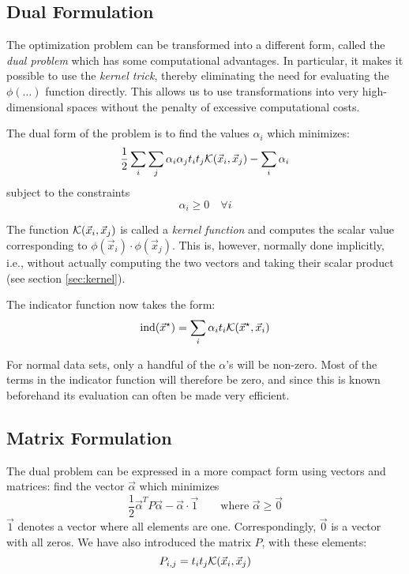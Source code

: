 \documentclass{article}
\begin{document}
\subsection{Dual Formulation}

The optimization problem can be transformed into a different form,
called the \emph{dual problem} which has some computational
advantages.  In particular, it makes it possible to use the
\emph{kernel trick}, thereby eliminating the need for evaluating the
\(\phi(\ldots)\) function directly.  This allows us to use
transformations into very high-dimensional spaces without the
penalty of excessive computational costs.

The dual form of the problem is to find the values \(\alpha_i\) which minimizes:
\begin{equation}\label{eq:dual}
  \frac{1}{2}\sum_i\sum_j\alpha_i\alpha_j t_it_j
  {\cal K}(\vec{x}_i, \vec{x}_j)
  -\sum_i\alpha_i
\end{equation}
subject to the constraints
\begin{equation}\label{eq:dualconstraints}
  \alpha_i \ge 0 \quad \forall i
\end{equation}

The function \({\cal K}(\vec{x}_i, \vec{x}_j)\) is called a \emph{kernel
  function} and computes the scalar value corresponding to
\(\phi(\vec{x}_i)\cdot\phi(\vec{x}_j)\).  This is, however, normally done
implicitly, i.e., without actually computing the two vectors and
taking their scalar product (see section \ref{sec:kernel}).

The indicator function now takes the form:
\begin{equation}\label{eq:dualindicator}
  \mathrm{ind}(\vec{x}^\star) = \sum_i \alpha_i t_i
  {\cal K}(\vec{x}^\star, \vec{x}_i)
\end{equation}

For normal data sets, only a handful of the \(\alpha\)'s will be
non-zero.  Most of the terms in the indicator function will therefore
be zero, and since this is known beforehand its evaluation can often
be made very efficient.


\subsection{Matrix Formulation}

The dual problem can be expressed in a more compact form using vectors
and matrices: find the vector \(\vec{\alpha}\) which minimizes
\begin{equation}\label{eq:ourprob}
  \frac{1}{2}\vec{\alpha}^T P \vec{\alpha} -
  \vec{\alpha}\cdot\vec{1} \qquad \textrm{where } \vec{\alpha}\ge\vec{0}
\end{equation}
\(\vec{1}\) denotes a vector where all elements are one.
Correspondingly, \(\vec{0}\) is a vector with all zeros.
We have also introduced the matrix \(P\), with these elements:
\begin{equation}\label{eq:kernel}
  P_{i,j} = t_i t_j {\cal K}(\vec{x}_i, \vec{x}_j)
\end{equation}
\end{document}
